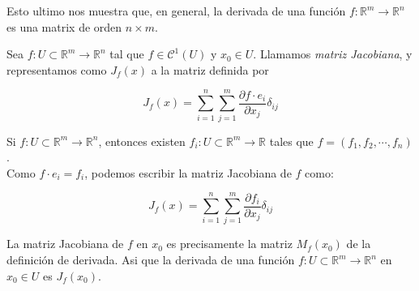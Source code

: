 \documentclass[letterpaper, 12pt]{article} %
\begin{document}
\begin{observation}
Esto ultimo nos muestra que, en general, la derivada de una función $f : \mathbb{R}^{m} \longrightarrow \mathbb{R}^{n}$
 es una matrix de orden $n \times m$.
\end{observation}

\begin{definition}
Sea $f : U \subset \mathbb{R}^{m} \longrightarrow \mathbb{R}^{n}$ tal que $f \in \mathcal{C}^{1}(U)$ y $x_{0} \in U$.
Llamamos {\it matriz Jacobiana}, y representamos como $J_{f}(x)$ a la matriz definida por

$$J_{f}(x) = \sum_{i=1}^{n}\sum_{j=1}^{m} \frac{\partial f \cdot e_{i}}{\partial x_{j}} \delta_{ij}$$
\end{definition}

\begin{observation}
Si $f : U \subset \mathbb{R}^{m} \longrightarrow \mathbb{R}^{n}$, entonces existen
$f_{i} : U \subset \mathbb{R}^{m} \longrightarrow \mathbb{R}$ tales que $f = (f_{1}, f_{2}, \cdots, f_{n})$.\\

Como $f \cdot e_{i} = f_{i}$, podemos escribir la matriz Jacobiana de $f$ como:

$$J_{f}(x) = \sum_{i=1}^{n}\sum_{j=1}^{m} \frac{\partial f_{i}}{\partial x_{j}} \delta_{ij}$$
\end{observation}

\begin{observation}
La matriz Jacobiana de $f$ en $x_{0}$ es precisamente la matriz $M_{f}(x_{0})$ de la definición de derivada.
Asi que la derivada de una función $f : U \subset \mathbb{R}^{m} \longrightarrow \mathbb{R}^{n}$ en $x_{0} \in U$
es $J_{f}(x_{0})$.
\end{observation}
\end{document}
